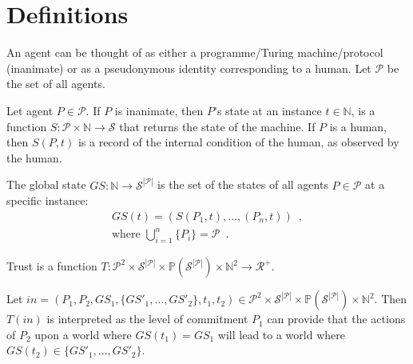 \section{Definitions}
  \begin{definition}[Agent]
     An agent can be thought of as either a programme/Turing machine/protocol (inanimate) or as a pseudonymous identity
     corresponding to a human. Let $\mathcal{P}$ be the set of all agents.
  \end{definition}
  \begin{definition}[State]
    Let agent $P \in \mathcal{P}$. If $P$ is inanimate, then $P$'s state at an instance $t \in \mathbb{N}$, is a function $S :
    \mathcal{P} \times \mathbb{N} \rightarrow \mathcal{S}$ that returns the state of the machine. If $P$ is a human, then
    $S\left(P, t\right)$ is a record of the internal condition of the human, as observed by the human.
  \end{definition}
  \begin{definition}
    The global state $GS : \mathbb{N} \rightarrow \mathcal{S}^{|\mathcal{P}|}$ is the set of the states of all agents $P \in
    \mathcal{P}$ at a specific instance: 
    \begin{gather*}
      GS\left(t\right) = \left(S\left(P_1, t\right), ...,\left(P_n, t\right)\right) \enspace, \\
      \mbox{where } \bigcup\limits_{i = 1}^n\{P_i\} = \mathcal{P} \enspace.
    \end{gather*}
  \end{definition}
  \begin{definition}[Trust]
    Trust is a function $T : \mathcal{P}^2 \times \mathcal{S}^{|\mathcal{P}|} \times
    \mathbb{P}\left(\mathcal{S}^{|\mathcal{P}|}\right) \times \mathbb{N}^2 \rightarrow \mathcal{R}^{+}$.
  \end{definition}
  \noindent Let $in = \left(P_1, P_2, GS_1, \{GS'_1, ...,GS'_2\}, t_1, t_2\right) \in \mathcal{P}^2 \times
  \mathcal{S}^{|\mathcal{P}|} \times \mathbb{P}\left(\mathcal{S}^{|\mathcal{P}|}\right) \times \mathbb{N}^2$. Then
  $T\left(in\right)$ is interpreted as the level of commitment $P_1$ can provide that the actions of $P_2$ upon a world where
  $GS\left(t_1\right) = GS_1$ will lead to a world where $GS\left(t_2\right) \in \{GS'_1, ...,GS'_2\}$.

